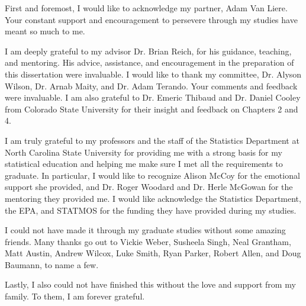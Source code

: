 \begin{acknowledgements}
First and foremost, I would like to acknowledge my partner, Adam Van Liere.
Your constant support and encouragement to persevere through my studies have meant so much to me.

I am deeply grateful to my advisor Dr. Brian Reich, for his guidance, teaching, and mentoring. 
His advice, assistance, and encouragement in the preparation of this dissertation were invaluable.
I would like to thank my committee, Dr. Alyson Wilson, Dr. Arnab Maity, and Dr. Adam Terando.
Your comments and feedback were invaluable. 
I am also grateful to Dr. Emeric Thibaud and Dr. Daniel Cooley from Colorado State University for their insight and feedback on Chapters 2 and 4.

I am truly grateful to my professors and the staff of the Statistics Department at North Carolina State University for providing me with a strong basis for my statistical education and helping me make sure I met all the requirements to graduate.
In particular, I would like to recognize Alison McCoy for the emotional support she provided, and Dr. Roger Woodard and Dr. Herle McGowan for the mentoring they provided me. 
I would like acknowledge the Statistics Department, the EPA, and STATMOS for the funding they have provided during my studies.

I could not have made it through my graduate studies without some amazing friends.
Many thanks go out to Vickie Weber, Susheela Singh, Neal Grantham, Matt Austin, Andrew Wilcox, Luke Smith, Ryan Parker, Robert Allen, and Doug Baumann, to name a few.

Lastly, I also could not have finished this without the love and support from my family.
To them, I am forever grateful.

\end{acknowledgements}


\thesistableofcontents

\thesislistoftables

\thesislistoffigures
